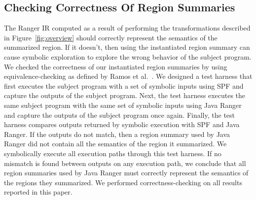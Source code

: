 \subsection{Checking Correctness Of Region Summaries}
The Ranger IR computed as a result of performing the transformations described in Figure~\ref{fig:overview} should
correctly represent the semantics of the summarized region.
%
If it doesn't, then using the instantiated region summary can cause symbolic exploration to explore the wrong behavior
of the subject program.
%
We checked the correctness of our instantiated region summaries by using equivalence-checking as defined by Ramos et al.~\cite{ramos}.
%
We designed a test harness that first executes the subject program with a set of symbolic inputs using SPF and
capture the outputs of the subject program.
%
Next, the test harness executes the same subject program with the same set of symbolic inputs using Java Ranger and
capture the outputs of the subject program once again.
%
Finally, the test harness compares outputs returned by symbolic execution with SPF and Java Ranger.
%
If the outputs do not match, then a region summary used by Java Ranger did not contain all the semantics
of the region it summarized.
%
We symbolically execute all execution paths through this test harness.
%
If no mismatch is found between outputs on any execution path, we conclude that all region summaries used by Java Ranger
must correctly represent the semantics of the regions they summarized.
%
We performed correctness-checking on all results reported in this paper.
